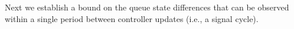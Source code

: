 %
Next we establish a bound on the queue state differences that can be observed within a single period between controller updates (i.e., a signal cycle). 
